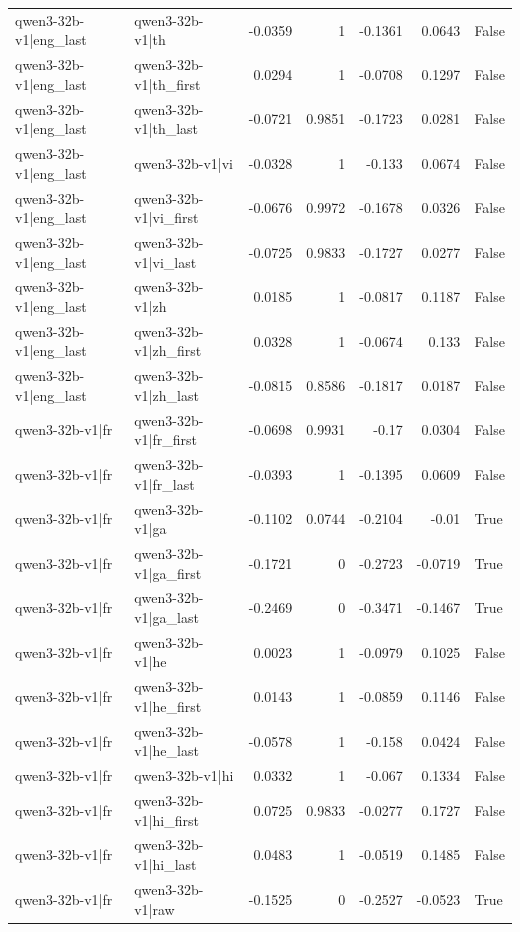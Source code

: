 \begin{table}
\begin{tabular}{l l r r r r l}
qwen3-32b-v1|eng_last & qwen3-32b-v1|th & -0.0359 & 1 & -0.1361 & 0.0643 & False \\
qwen3-32b-v1|eng_last & qwen3-32b-v1|th_first & 0.0294 & 1 & -0.0708 & 0.1297 & False \\
qwen3-32b-v1|eng_last & qwen3-32b-v1|th_last & -0.0721 & 0.9851 & -0.1723 & 0.0281 & False \\
qwen3-32b-v1|eng_last & qwen3-32b-v1|vi & -0.0328 & 1 & -0.133 & 0.0674 & False \\
qwen3-32b-v1|eng_last & qwen3-32b-v1|vi_first & -0.0676 & 0.9972 & -0.1678 & 0.0326 & False \\
qwen3-32b-v1|eng_last & qwen3-32b-v1|vi_last & -0.0725 & 0.9833 & -0.1727 & 0.0277 & False \\
qwen3-32b-v1|eng_last & qwen3-32b-v1|zh & 0.0185 & 1 & -0.0817 & 0.1187 & False \\
qwen3-32b-v1|eng_last & qwen3-32b-v1|zh_first & 0.0328 & 1 & -0.0674 & 0.133 & False \\
qwen3-32b-v1|eng_last & qwen3-32b-v1|zh_last & -0.0815 & 0.8586 & -0.1817 & 0.0187 & False \\
qwen3-32b-v1|fr & qwen3-32b-v1|fr_first & -0.0698 & 0.9931 & -0.17 & 0.0304 & False \\
qwen3-32b-v1|fr & qwen3-32b-v1|fr_last & -0.0393 & 1 & -0.1395 & 0.0609 & False \\
qwen3-32b-v1|fr & qwen3-32b-v1|ga & -0.1102 & 0.0744 & -0.2104 & -0.01 & True \\
qwen3-32b-v1|fr & qwen3-32b-v1|ga_first & -0.1721 & 0 & -0.2723 & -0.0719 & True \\
qwen3-32b-v1|fr & qwen3-32b-v1|ga_last & -0.2469 & 0 & -0.3471 & -0.1467 & True \\
qwen3-32b-v1|fr & qwen3-32b-v1|he & 0.0023 & 1 & -0.0979 & 0.1025 & False \\
qwen3-32b-v1|fr & qwen3-32b-v1|he_first & 0.0143 & 1 & -0.0859 & 0.1146 & False \\
qwen3-32b-v1|fr & qwen3-32b-v1|he_last & -0.0578 & 1 & -0.158 & 0.0424 & False \\
qwen3-32b-v1|fr & qwen3-32b-v1|hi & 0.0332 & 1 & -0.067 & 0.1334 & False \\
qwen3-32b-v1|fr & qwen3-32b-v1|hi_first & 0.0725 & 0.9833 & -0.0277 & 0.1727 & False \\
qwen3-32b-v1|fr & qwen3-32b-v1|hi_last & 0.0483 & 1 & -0.0519 & 0.1485 & False \\
qwen3-32b-v1|fr & qwen3-32b-v1|raw & -0.1525 & 0 & -0.2527 & -0.0523 & True \\

\end{tabular}
\end{table}
